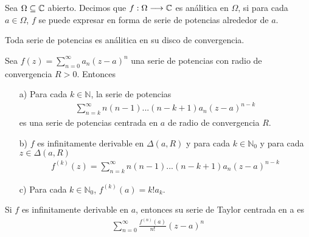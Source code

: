 \begin{defi}
    Sea $\Omega \subseteq \mathbb{C}$ abierto. Decimos que $f: \Omega \longrightarrow \mathbb{C}$ es análitica en $\Omega$, si para cada $a \in \Omega$, $f$ se puede expresar en forma de serie de potencias alrededor de $a$.
\end{defi}

\begin{obs}
    Toda serie de potencias es análitica en su disco de convergencia.
\end{obs}

\begin{teo}
    Sea $f(z) = \sum_{n=0}^{\infty}{a_n(z-a)^n}$ una serie de potencias con radio de convergencia $R > 0$. Entonces
    \begin{enumerate}
        \item[a)] Para cada $k \in \mathbb{N}$, la serie de potencias
              \begin{align*}
                  \sum_{n=k}^{\infty}{n(n-1)...(n-k+1)a_n(z-a)^{n-k}}
              \end{align*}
              es una serie de potencias centrada en $a$ de radio de convergencia $R$.
        \item[b)] $f$ es infinitamente derivable en $\Delta(a,R)$ y para cada $k \in \mathbb{N}_0$ y para cada $z \in \Delta(a,R)$
              \begin{align*}
                  f^{(k)}(z) = \sum_{n=k}^{\infty}{n(n-1)...(n-k+1)a_n(z-a)^{n-k}}
              \end{align*}
        \item[c)] Para cada $k \in \mathbb{N}_0$, $f^{(k)}(a) = k! a_k$.
    \end{enumerate}
\end{teo}

\begin{defi}
    Si $f$ es infinitamente derivable en $a$, entonces su serie de Taylor centrada en a es
    \begin{align*}
        \sum_{n=0}^{\infty}{\frac{f^{(n)}(a)}{n!}(z-a)^n}
    \end{align*}
\end{defi}

